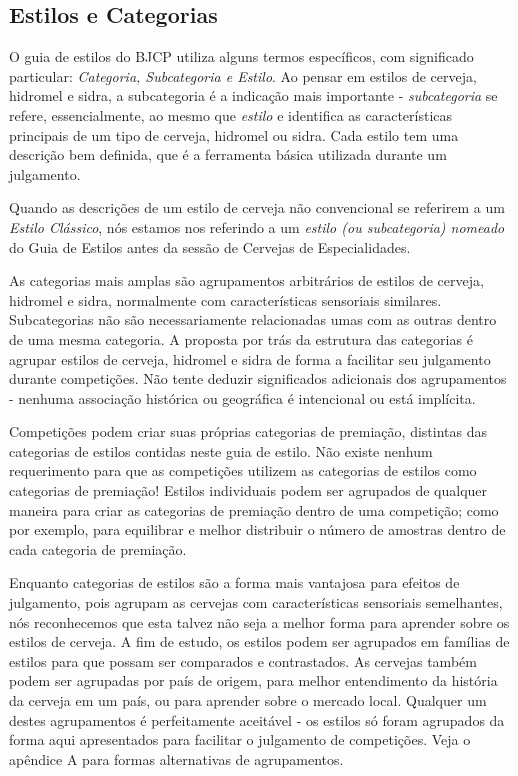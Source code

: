 \subsection*{Estilos e Categorias}
O guia de estilos do BJCP utiliza alguns termos específicos, com significado particular: \textit{Categoria, Subcategoria e Estilo}. Ao pensar em estilos de cerveja, hidromel e sidra, a subcategoria é a indicação mais importante - \textit{subcategoria} se refere, essencialmente, ao mesmo que \textit{estilo} e identifica as características principais de um tipo de cerveja, hidromel ou sidra. Cada estilo tem uma descrição bem definida, que é a ferramenta básica utilizada durante um julgamento.

Quando as descrições de um estilo de cerveja não convencional se referirem a um \textit{Estilo Clássico}, nós estamos nos referindo a um \textit{estilo (ou subcategoria) nomeado} do Guia de Estilos antes da sessão de Cervejas de Especialidades.

As categorias mais amplas são agrupamentos arbitrários de estilos de cerveja, hidromel e sidra, normalmente com características sensoriais similares. Subcategorias não são necessariamente relacionadas umas com as outras dentro de uma mesma categoria. A proposta por trás da estrutura das categorias é agrupar estilos de cerveja, hidromel e sidra de forma a facilitar seu julgamento durante competições. Não tente deduzir significados adicionais dos agrupamentos - nenhuma associação histórica ou geográfica é intencional ou está implícita.

Competições podem criar suas próprias categorias de premiação, distintas das categorias de estilos contidas neste guia de estilo. Não existe nenhum requerimento para que as competições utilizem as categorias de estilos como categorias de premiação! Estilos individuais podem ser agrupados de qualquer maneira para criar as categorias de premiação dentro de uma competição; como por exemplo, para equilibrar e melhor distribuir o número de amostras dentro de cada categoria de premiação.

Enquanto categorias de estilos são a forma mais vantajosa para efeitos de julgamento, pois agrupam as cervejas com características sensoriais semelhantes, nós reconhecemos que esta talvez não seja a melhor forma para aprender sobre os estilos de cerveja. A fim de estudo, os estilos podem ser agrupados em famílias de estilos para que possam ser comparados e contrastados. As cervejas também podem ser agrupadas por país de origem, para melhor entendimento da história da cerveja em um país, ou para aprender sobre o mercado local. Qualquer um destes agrupamentos é perfeitamente aceitável - os estilos só foram agrupados da forma aqui apresentados para facilitar o julgamento de competições. Veja o apêndice A para formas alternativas de agrupamentos.

